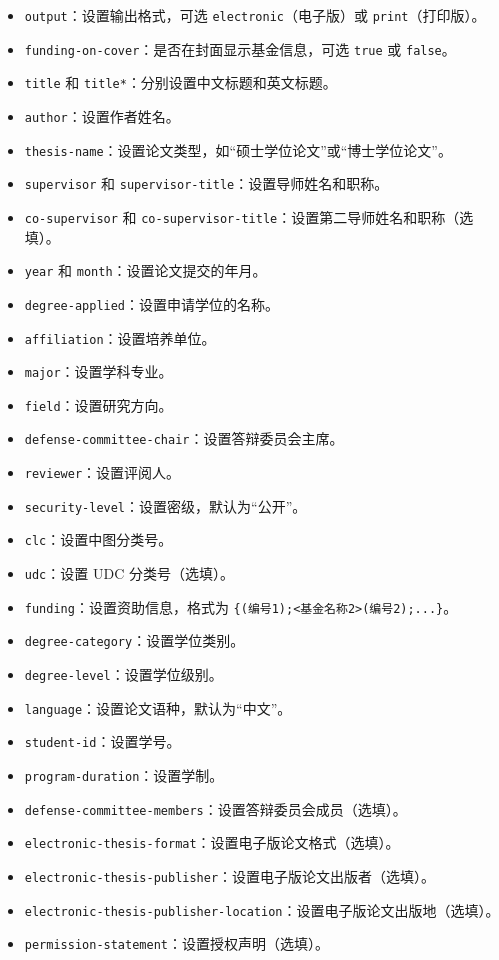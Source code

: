 \begin{itemize}
    \item \texttt{output}：设置输出格式，可选 \texttt{electronic}（电子版）或 \texttt{print}（打印版）。
    \item \texttt{funding-on-cover}：是否在封面显示基金信息，可选 \texttt{true} 或 \texttt{false}。
    \item \texttt{title} 和 \texttt{title*}：分别设置中文标题和英文标题。
    \item \texttt{author}：设置作者姓名。
    \item \texttt{thesis-name}：设置论文类型，如“硕士学位论文”或“博士学位论文”。
    \item \texttt{supervisor} 和 \texttt{supervisor-title}：设置导师姓名和职称。
    \item \texttt{co-supervisor} 和 \texttt{co-supervisor-title}：设置第二导师姓名和职称（选填）。
    \item \texttt{year} 和 \texttt{month}：设置论文提交的年月。
    \item \texttt{degree-applied}：设置申请学位的名称。
    \item \texttt{affiliation}：设置培养单位。
    \item \texttt{major}：设置学科专业。
    \item \texttt{field}：设置研究方向。
    \item \texttt{defense-committee-chair}：设置答辩委员会主席。
    \item \texttt{reviewer}：设置评阅人。
    \item \texttt{security-level}：设置密级，默认为“公开”。
    \item \texttt{clc}：设置中图分类号。
    \item \texttt{udc}：设置 UDC 分类号（选填）。
    \item \texttt{funding}：设置资助信息，格式为 \texttt{\{<基金名称1>(编号1);<基金名称2>(编号2);...\}}。
    \item \texttt{degree-category}：设置学位类别。
    \item \texttt{degree-level}：设置学位级别。
    \item \texttt{language}：设置论文语种，默认为“中文”。
    \item \texttt{student-id}：设置学号。
    \item \texttt{program-duration}：设置学制。
    \item \texttt{defense-committee-members}：设置答辩委员会成员（选填）。
    \item \texttt{electronic-thesis-format}：设置电子版论文格式（选填）。
    \item \texttt{electronic-thesis-publisher}：设置电子版论文出版者（选填）。
    \item \texttt{electronic-thesis-publisher-location}：设置电子版论文出版地（选填）。
    \item \texttt{permission-statement}：设置授权声明（选填）。
\end{itemize}

